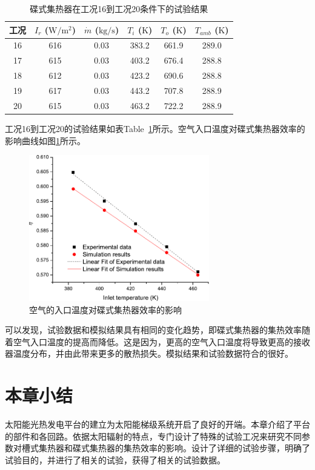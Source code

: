 \begin{table}[htbp]\footnotesize
	\caption{碟式集热器在工况16到工况20条件下的试验结果}
	\begin{center}
	\begin{tabular}{cccccc}
		\toprule
		工况	& $I_r$ ($\mathrm{W/m^2}$)	&	$\dot{m}$ ($\mathrm{kg/s}$)			&	$T_i$ ($\mathrm{K}$)	&	$T_o$ ($\mathrm{K}$)		&	$T_{amb}$ ($\mathrm{K}$)\\
		\midrule
		16	&	616	&	0.03	&	383.2	&	661.9	&	289.0\\
		17	&	615	&	0.03	&	403.2	&	676.4	&	288.8\\
		18	&	612	&	0.03	&	423.2	&	690.6	&	288.8	\\
		19	&	617	&	0.03	&	443.2	&	707.8	&	288.9\\
		20	&	615	&	0.03	&	463.2	&	722.2	&	288.9\\
		\bottomrule
	\end{tabular}
	\end{center}
	\label{tab:ResultOfDish3}
\end{table}
工况16到工况20的试验结果如表Table~\ref{tab:ResultOfDish3}所示。空气入口温度对碟式集热器效率的影响曲线如图\ref{fig:T_i-eta-dish}所示。
\begin{figure}[!ht]
\centering
\includegraphics[width=0.7\textwidth]{fig/T_i-eta-dish}
\caption{空气的入口温度对碟式集热器效率的影响}
\label{fig:T_i-eta-dish}
\end{figure}

可以发现，试验数据和模拟结果具有相同的变化趋势，即碟式集热器的集热效率随着空气入口温度的提高而降低。这是因为，更高的空气入口温度将导致更高的接收器温度分布，并由此带来更多的散热损失。模拟结果和试验数据符合的很好。

\section{本章小结}
太阳能光热发电平台的建立为太阳能梯级系统开启了良好的开端。本章介绍了平台的部件和各回路。依据太阳辐射的特点，专门设计了特殊的试验工况来研究不同参数对槽式集热器和碟式集热器的集热效率的影响。设计了详细的试验步骤，明确了试验目的，并进行了相关的试验，获得了相关的试验数据。

